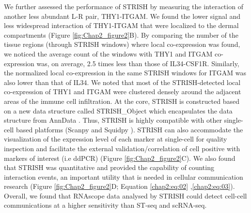 We further assessed the performance of STRISH by measuring the interaction of another less abundant L-R pair, THY1-ITGAM. We found the lower signal and less widespread interaction of THY1-ITGAM that were localized to the dermal compartments (Figure \ref{fig:Chap2_figure2}B). By comparing the number of the tissue regions (through STRISH windows) where local co-expression was found, we noticed the average count of the windows with THY1 and ITGAM co-expression was, on average, 2.5 times less than those of IL34-CSF1R. Similarly, the normalized local co-expression in the same STRISH windows for ITGAM was also lower than that of IL34. We noted that most of the STRISH-detected local co-expression of THY1 and ITGAM were clustered densely around the adjacent areas of the immune cell infiltration. At the core, STRISH is constructed based on a new data structure called STRISH\_Object which encapsulates the data structure from AnnData \cite{wolf2018scanpy}. Thus, STRISH is highly compatible with other single-cell based platforms (\ie Scanpy \cite{wolf2018scanpy} and Squidpy \cite{palla2022squidpy}). STRISH can also accommodate the visualization of the expression level of each marker at single-cell for quality inspection and facilitate the external validation/correlation of cell positive with markers of interest (i.e ddPCR) (Figure \ref{fig:Chap2_figure2}C). We also found that STRISH was quantitative and provided the capability of counting interaction events, an important utility that is needed in cellular communication research (Figure \ref{fig:Chap2_figure2}D; Equation \ref{chap2:eq:02} ,\ref{chap2:eq:03}). Overall, we found that RNAscope data analysed by STRISH could detect cell-cell communications at a higher sensitivity than ST-seq and scRNA-seq. 
